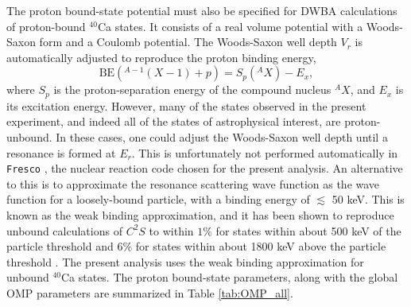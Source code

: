 The proton bound-state potential must also be specified for DWBA calculations of proton-bound $^{40}$Ca states. It consists of a real volume potential with a Woods-Saxon form and a Coulomb potential. The Woods-Saxon well depth $V_{r}$ is automatically adjusted to reproduce the proton binding energy,
\begin{equation}
\mathrm{BE}\left(^{A-1}(X-1) + p \right) = S_{p}(^{A}X) - E_{x},
\end{equation}
where $S_{p}$ is the proton-separation energy of the compound nucleus $^{A}X$, and $E_{x}$ is its excitation energy. However, many of the states observed in the present experiment, and indeed all of the states of astrophysical interest, are proton-unbound. In these cases, one could adjust the Woods-Saxon well depth until a resonance is formed at $E_{r}$. This is unfortunately not performed automatically in \texttt{Fresco} \cite{Thompson1988,Fresco}, the nuclear reaction code chosen for the present analysis. An alternative to this is to approximate the resonance scattering wave function as the wave function for a loosely-bound particle, with a binding energy of $\lesssim$ 50 keV. This is known as the weak binding approximation, and it has been shown to reproduce unbound calculations of $C^{2}S$ to within $1\%$ for states within about 500 keV of the particle threshold and $6\%$ for states within about 1800 keV above the particle threshold \cite{Kankainen2016,Kahl2019}. The present analysis uses the weak binding approximation for unbound $^{40}$Ca states. The proton bound-state parameters, along with the global OMP parameters are summarized in Table \ref{tab:OMP_all}.

\begin{table}[t]
\caption{\label{tab:OMP_all}Global optical model potential parameters for $^{39}\mathrm{K} + \,^{3}\mathrm{He}$ and $^{40}\mathrm{Ca} + d$ and the proton bound-state parameters.}
\end{table}

